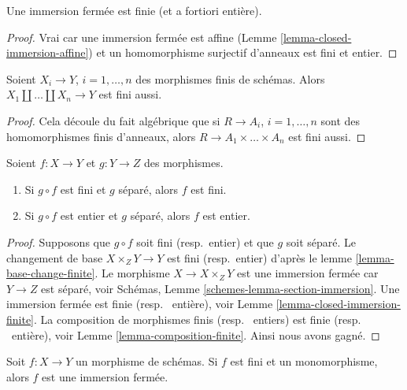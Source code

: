 \begin{lemma}
\label{lemma-closed-immersion-finite}
Une immersion fermée est finie (et a fortiori entière).
\end{lemma}

\begin{proof}
Vrai car une immersion fermée est affine
(Lemme \ref{lemma-closed-immersion-affine}) et un homomorphisme
surjectif d'anneaux est fini et entier.
\end{proof}

\begin{lemma}
\label{lemma-finite-union-finite}
Soient $X_i \to Y$, $i = 1, \ldots, n$ des morphismes finis de
schémas. Alors $X_1 \amalg \ldots \amalg X_n \to Y$ est fini aussi.
\end{lemma}

\begin{proof}
Cela découle du fait algébrique que si $R \to A_i$, $i = 1, \ldots, n$ sont
des homomorphismes finis d'anneaux, alors $R \to A_1 \times \ldots \times A_n$ est fini aussi.
\end{proof}

\begin{lemma}
\label{lemma-finite-permanence}
Soient $f : X \to Y$ et $g : Y \to Z$ des morphismes.
\begin{enumerate}
\item Si $g \circ f$ est fini et $g$ séparé, alors $f$ est fini.
\item Si $g \circ f$ est entier et $g$ séparé, alors $f$ est entier.
\end{enumerate}
\end{lemma}

\begin{proof}
Supposons que $g \circ f$ soit fini (resp.\ entier) et que $g$ soit
séparé. Le changement de base $X \times_Z Y \to Y$ est fini (resp.\
entier) d'après le lemme
\ref{lemma-base-change-finite}. Le morphisme $X \to X \times_Z Y$
est une immersion fermée car $Y \to Z$ est séparé,
voir Schémas, Lemme \ref{schemes-lemma-section-immersion}. Une immersion
fermée est finie (resp. \  entière),
voir Lemme \ref{lemma-closed-immersion-finite}. La composition de morphismes
finis (resp. \  entiers) est finie (resp.
\  entière),
voir Lemme \ref{lemma-composition-finite}. Ainsi nous avons gagné.
\end{proof}

\begin{lemma}
\label{lemma-finite-monomorphism-closed}
Soit $f : X \to Y$ un morphisme de schémas. Si $f$
est fini et un monomorphisme, alors $f$ est une immersion fermée.
\end{lemma}

